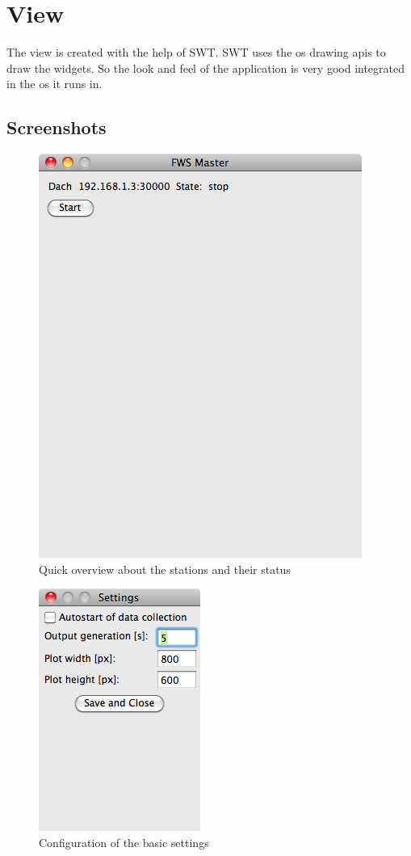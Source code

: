 
\section{View} %
\label{sec:view}

The view is created with the help of SWT. SWT uses the os drawing apis to draw the widgets. So the look and feel of the application is very good integrated in the os it runs in. 

\subsection{Screenshots} %
\label{sub:screenshots}

\begin{figure}[ht]
    \centering
    \includegraphics[width=0.6\linewidth]{master/mainview.png}
    \caption{Quick overview about the stations and their status}
    \label{fig:main}
\end{figure}

\begin{figure}[ht]
    \centering
    \includegraphics[width=0.4\linewidth]{master/settings.png}
    \caption{Configuration of the basic settings}
    \label{fig:settings}
\end{figure}

